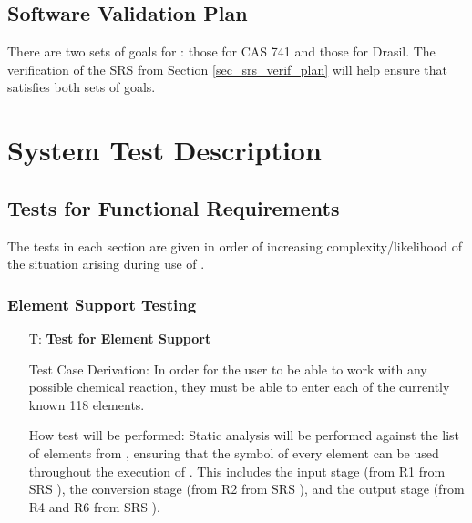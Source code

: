 \documentclass[12pt, titlepage]{article}
\newcounter{testnum} %
\begin{document}
\subsection{Software Validation Plan}

There are two sets of goals for \progname{}: those for CAS 741 and those for
Drasil. The verification of the SRS from Section \ref{sec_srs_verif_plan}
will help ensure that \progname{} satisfies both sets of goals.

 

\section{System Test Description} \label{sec_sys_tests}

\subsection{Tests for Functional Requirements} \label{sec_sysFunReqs}

The tests in each section are given in order of increasing
complexity/likelihood of the situation arising during use of \progname{}.

\subsubsection{Element Support Testing}

\begin{enumerate}

  \item[T\refstepcounter{testnum}\thetestnum \label{test_element_support}:]
    \textbf{Test for Element Support}

    Test Case Derivation: In order for the user to be able to work with any
    possible chemical reaction, they must be able to enter each of the
    currently known 118 elements.

    How test will be performed: Static analysis will be performed against the
    list of elements from \cite{helmenstine_list_2020}, ensuring that the
    symbol of every element can be used throughout the execution of
    \progname{}. This includes the input stage (from R1 from SRS ), the conversion stage (from R2 from SRS ), and the
    output stage (from R4 and R6 from SRS ).

\end{enumerate}
\end{document}

